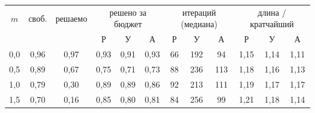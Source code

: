 \begin{tabular}{ccc|ccc|ccc|ccc}
\toprule
$m$ & своб. & решаемо & \multicolumn{3}{c|}{решено за бюджет} & \multicolumn{3}{c|}{итераций (медиана)} & \multicolumn{3}{c}{длина / кратчайший} \\
 & & & Р & У & А & Р & У & А & Р & У & А \\
\midrule
0{,}0 & 0{,}96 & 0{,}97 & 0{,}93 & 0{,}91 & 0{,}93 & 66 & 192 & 94 & 1{,}15 & 1{,}14 & 1{,}11 \\
0{,}5 & 0{,}89 & 0{,}67 & 0{,}75 & 0{,}71 & 0{,}73 & 88 & 236 & 113 & 1{,}18 & 1{,}16 & 1{,}13 \\
1{,}0 & 0{,}79 & 0{,}30 & 0{,}89 & 0{,}89 & 0{,}86 & 92 & 213 & 111 & 1{,}19 & 1{,}17 & 1{,}17 \\
1{,}5 & 0{,}70 & 0{,}16 & 0{,}85 & 0{,}80 & 0{,}81 & 84 & 256 & 99 & 1{,}21 & 1{,}18 & 1{,}14 \\
\bottomrule
\end{tabular}
